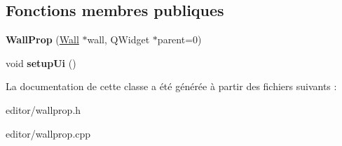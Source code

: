 \subsection*{Fonctions membres publiques}
\begin{DoxyCompactItemize}
\item 
\hypertarget{classWallProp_adb6bbb2ab2fbbb9a8e15a3f38b421595}{{\bfseries Wall\+Prop} (\hyperlink{classWall}{Wall} $\ast$wall, Q\+Widget $\ast$parent=0)}\label{classWallProp_adb6bbb2ab2fbbb9a8e15a3f38b421595}

\item 
\hypertarget{classWallProp_ad6a83260d08c321f8283d29505504c7f}{void {\bfseries setup\+Ui} ()}\label{classWallProp_ad6a83260d08c321f8283d29505504c7f}

\end{DoxyCompactItemize}


La documentation de cette classe a été générée à partir des fichiers suivants \+:\begin{DoxyCompactItemize}
\item 
editor/wallprop.\+h\item 
editor/wallprop.\+cpp\end{DoxyCompactItemize}
